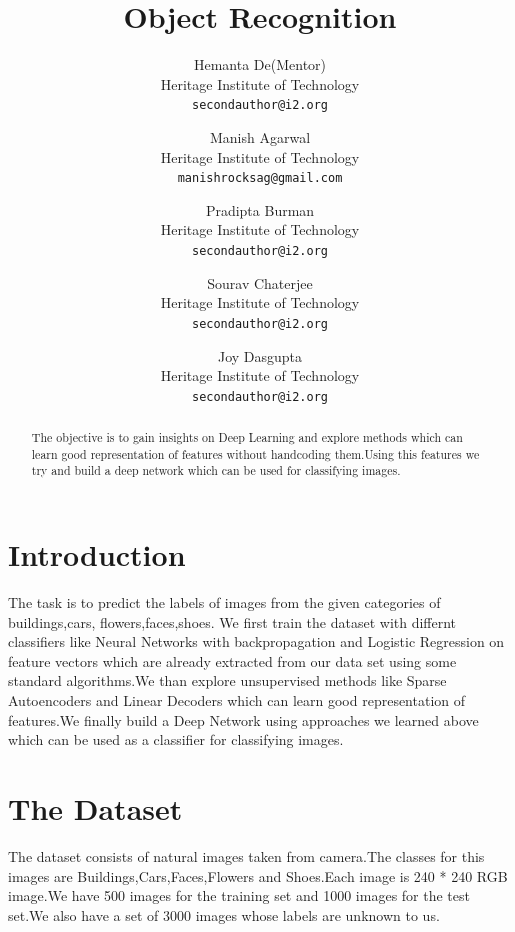 \documentclass[11pt,twocolumn,letterpaper]{article}
\begin{document}
\title{\LARGE Object Recognition}

\author{Hemanta De(Mentor)\\
Heritage Institute of Technology\\
{\tt\small secondauthor@i2.org}
\and
Manish Agarwal\\
Heritage Institute of Technology\\
{\tt\small manishrocksag@gmail.com}
\and
Pradipta Burman\\
Heritage Institute of Technology\\
{\tt\small secondauthor@i2.org}
\and
Sourav Chaterjee\\
Heritage Institute of Technology\\
{\tt\small secondauthor@i2.org}
\and
Joy Dasgupta\\
Heritage Institute of Technology\\
{\tt\small secondauthor@i2.org}
}
\maketitle
\thispagestyle{empty}

\begin{abstract}
The objective is to gain insights on Deep Learning and explore methods which can learn good representation of features without handcoding them.Using this features we try and  build a deep network which can be used for classifying images.
\end{abstract}
\section{Introduction}
The task is to predict the labels of images from the given categories of buildings,cars,
flowers,faces,shoes. We first train the dataset with differnt classifiers like Neural Networks with backpropagation and Logistic Regression on feature vectors which are already extracted from our data set using some standard algorithms.We than explore unsupervised methods like Sparse Autoencoders and Linear Decoders which can learn good representation of features.We finally build a Deep Network using approaches we learned above which can be used as a classifier for classifying images.
\section{The Dataset}
The dataset consists of natural images taken from camera.The classes for this images are Buildings,Cars,Faces,Flowers and Shoes.Each image is 240 * 240 RGB image.We have 500 images for the training set and 1000 images for the test set.We also have a set of 3000 images whose labels are unknown to us.
\end{document}
